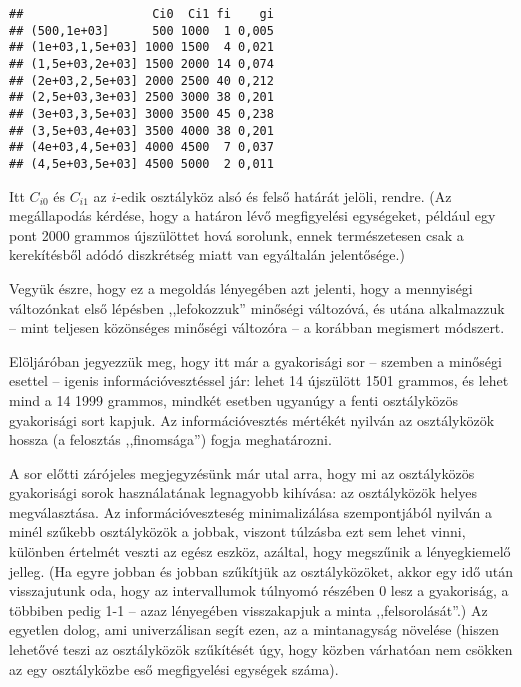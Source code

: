 \documentclass[]{book}
\newenvironment{Shaded}{\begin{snugshade}}{\end{snugshade}}
\newcommand{\KeywordTok}[1]{\textcolor[rgb]{0.13,0.29,0.53}{\textbf{#1}}}
\newcommand{\DataTypeTok}[1]{\textcolor[rgb]{0.13,0.29,0.53}{#1}}
\newcommand{\DecValTok}[1]{\textcolor[rgb]{0.00,0.00,0.81}{#1}}
\newcommand{\StringTok}[1]{\textcolor[rgb]{0.31,0.60,0.02}{#1}}
\newcommand{\OperatorTok}[1]{\textcolor[rgb]{0.81,0.36,0.00}{\textbf{#1}}}
\newcommand{\NormalTok}[1]{#1}
\begin{document}
\begin{Shaded}
\end{Shaded}

\begin{verbatim}
##                  Ci0  Ci1 fi    gi
## (500,1e+03]      500 1000  1 0,005
## (1e+03,1,5e+03] 1000 1500  4 0,021
## (1,5e+03,2e+03] 1500 2000 14 0,074
## (2e+03,2,5e+03] 2000 2500 40 0,212
## (2,5e+03,3e+03] 2500 3000 38 0,201
## (3e+03,3,5e+03] 3000 3500 45 0,238
## (3,5e+03,4e+03] 3500 4000 38 0,201
## (4e+03,4,5e+03] 4000 4500  7 0,037
## (4,5e+03,5e+03] 4500 5000  2 0,011
\end{verbatim}

Itt \(C_{i0}\) és \(C_{i1}\) az \(i\)-edik osztályköz alsó és felső
határát jelöli, rendre. (Az megállapodás kérdése, hogy a határon lévő
megfigyelési egységeket, például egy pont 2000 grammos újszülöttet hová
sorolunk, ennek természetesen csak a kerekítésből adódó diszkrétség
miatt van egyáltalán jelentősége.)

Vegyük észre, hogy ez a megoldás lényegében azt jelenti, hogy a
mennyiségi változónkat első lépésben ,,lefokozzuk'' minőségi változóvá,
és utána alkalmazzuk -- mint teljesen közönséges minőségi változóra -- a
korábban megismert módszert.

Elöljáróban jegyezzük meg, hogy itt már a gyakorisági sor -- szemben a
minőségi esettel -- igenis információvesztéssel jár: lehet 14 újszülött
1501 grammos, és lehet mind a 14 1999 grammos, mindkét esetben ugyanúgy
a fenti osztályközös gyakorisági sort kapjuk. Az információvesztés
mértékét nyilván az osztályközök hossza (a felosztás ,,finomsága'')
fogja meghatározni.

A sor előtti zárójeles megjegyzésünk már utal arra, hogy mi az
osztályközös gyakorisági sorok használatának legnagyobb kihívása: az
osztályközök helyes megválasztása. Az információveszteség minimalizálása
szempontjából nyilván a minél szűkebb osztályközök a jobbak, viszont
túlzásba ezt sem lehet vinni, különben értelmét veszti az egész eszköz,
azáltal, hogy megszűnik a lényegkiemelő jelleg. (Ha egyre jobban és
jobban szűkítjük az osztályközöket, akkor egy idő után visszajutunk oda,
hogy az intervallumok túlnyomó részében 0 lesz a gyakoriság, a többiben
pedig 1-1 -- azaz lényegében visszakapjuk a minta ,,felsorolását''.) Az
egyetlen dolog, ami univerzálisan segít ezen, az a mintanagyság növelése
(hiszen lehetővé teszi az osztályközök szűkítését úgy, hogy közben
várhatóan nem csökken az egy osztályközbe eső megfigyelési egységek
száma).
\end{document}
